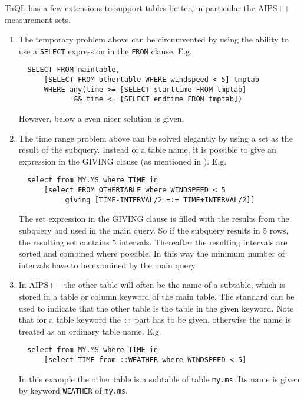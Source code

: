 TaQL has a few extensions to support tables better,
in particular the AIPS++ measurement sets.
\begin{enumerate}
\item
The temporary problem above can be circumvented by using the
ability to use a \texttt{SELECT} expression in the \texttt{FROM}
clause. E.g.
\begin{verbatim}
  SELECT FROM maintable,
      [SELECT FROM othertable WHERE windspeed < 5] tmptab
      WHERE any(time >= [SELECT starttime FROM tmptab]
             && time <= [SELECT endtime FROM tmptab])
\end{verbatim}
However, below a even nicer solution is given. 

\item
The time range problem above can be solved elegantly by using
a set as the result of the subquery. Instead of a table name,
it is possible to give an expression in the GIVING clause (as mentioned
in ). E.g.
\begin{verbatim}
  select from MY.MS where TIME in
      [select FROM OTHERTABLE where WINDSPEED < 5
           giving [TIME-INTERVAL/2 =:= TIME+INTERVAL/2]]
\end{verbatim}
The set expression in the GIVING clause is filled with the
results from the subquery and used in the main query. So if
the subquery results in 5 rows, the resulting set contains 5
intervals. Thereafter the resulting intervals are sorted and combined
where possible. In this way the minimum number of intervals have to be
examined by the main query.

\item
In AIPS++ the other table will often be the name of a subtable,
which is stored in a table or column keyword of the main table.
The standard  can be used
to indicate that the other table is the table in the given keyword.
Note that for a table keyword the \texttt{::} part has to be given,
otherwise the name is treated as an ordinary table name. E.g.
\begin{verbatim}
  select from MY.MS where TIME in
      [select TIME from ::WEATHER where WINDSPEED < 5]
\end{verbatim}
In this example the other table is a subtable of table \texttt{my.ms}.
Its name is given by keyword \texttt{WEATHER} of \texttt{my.ms}.


\end{enumerate}
